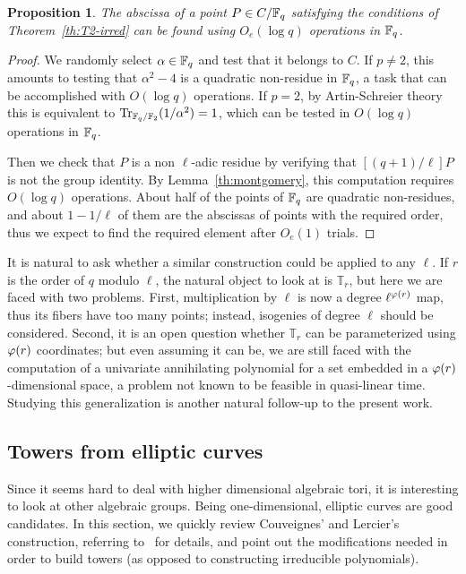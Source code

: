 \documentclass{sig-alternate}
\newtheorem{proposition}[definition]{Proposition}
\begin{document}
\begin{proposition}
  The abscissa of a point $P\in C/\mathbb{F}_q$ satisfying the
  conditions of Theorem~\ref{th:T2-irred} can be found using $O_e(\log
  q)$ operations in $\mathbb{F}_q$.
\end{proposition}
\begin{proof}
  We randomly select $\alpha\in\mathbb{F}_q$ and test that it belongs to
  $C$. If $p\ne2$, this amounts to testing that $\alpha^2-4$ is a
  quadratic non-residue in $\mathbb{F}_q$, a task that can be accomplished
  with $O(\log q)$ operations. If $p=2$, by Artin-Schreier theory this
  is equivalent to $\operatorname{Tr}_{\mathbb{F}_q/\mathbb{F}_2}(1/\alpha^2)=1$, which can be
  tested in $O(\log q)$ operations in $\mathbb{F}_q$.

  Then we check that $P$ is a non $\ell$-adic residue by verifying
  that $[(q+1)/\ell]P$ is not the group identity. By
  Lemma~\ref{th:montgomery}, this computation requires $O(\log q)$
  operations.
  About half of the points of $\mathbb{F}_q$ are quadratic non-residues, and
  about $1-1/\ell$ of them are the abscissas of points with the
  required order, thus we expect to find the required element after
  $O_e(1)$ trials.
\end{proof}

It is natural to ask whether a similar construction could be applied
to any $\ell$. If $r$ is the order of $q$ modulo $\ell$, the natural
object to look at is $\mathbb{T}_r$, but here we are faced with two
problems. First, multiplication by $\ell$ is now a degree
$\ell^{\varphi(r)}$ map, thus its fibers have too many points; instead,
isogenies of degree $\ell$ should be considered. Second, it is an open
question whether $\mathbb{T}_r$ can be parameterized using $\varphi(r)$
coordinates; but even assuming it can be, we are still faced with the
computation of a univariate annihilating polynomial for a set embedded
in a $\varphi(r)$-dimensional space, a problem not known to be feasible
in quasi-linear time. Studying this generalization is another natural
follow-up to the present work.


\subsection{Towers from elliptic curves}
\label{sec:elliptic}

Since it seems hard to deal with higher dimensional algebraic tori, it
is interesting to look at other algebraic groups. Being
one-dimensional, elliptic curves are good candidates. In this
section, we quickly review Couveignes' and Lercier's construction,
referring to~\cite{couveignes+lercier11} for details, and point out
the modifications needed in order to build towers (as opposed to
constructing irreducible polynomials).
\end{document}
